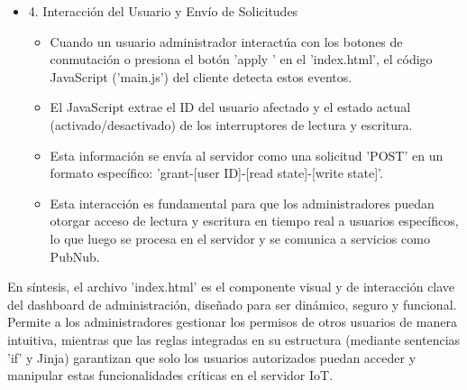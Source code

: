 \documentclass{report}
\begin{document}
\begin{itemize}
    \item 4. Interacción del Usuario y Envío de Solicitudes
    \begin{itemize}
        \item Cuando un usuario administrador interactúa con los botones de conmutación o presiona el botón  'apply ' en el 'index.html', el 
        código  JavaScript ('main.js')  del cliente detecta estos eventos.
        \item El JavaScript extrae el ID del usuario afectado y el estado actual (activado/desactivado) de los interruptores de lectura y 
        escritura.
        \item Esta información se envía al servidor como una  solicitud 'POST'  en un formato específico: 
        'grant-[user ID]-[read state]-[write state]'.
        \item Esta interacción es fundamental para que los administradores puedan  otorgar acceso de lectura y escritura en tiempo real  a 
        usuarios específicos, lo que luego se procesa en el servidor y se comunica a servicios como PubNub.
    \end{itemize}
\end{itemize}

En síntesis, el archivo 'index.html' es el componente visual y de interacción clave del dashboard de administración, diseñado para ser dinámico, 
seguro y funcional. Permite a los administradores gestionar los permisos de otros usuarios de manera intuitiva, mientras que las reglas integradas 
en su estructura (mediante sentencias 'if' y Jinja) garantizan que solo los usuarios autorizados puedan acceder y manipular estas funcionalidades 
críticas en el servidor IoT.
\end{document}

